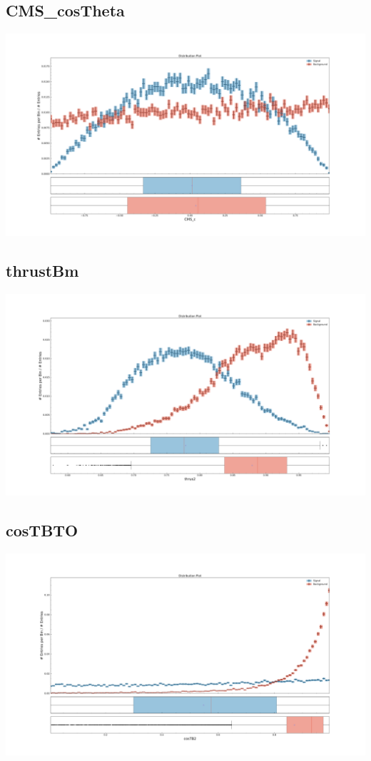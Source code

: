 \documentclass[10pt,a4paper]{article}
\begin{document}
\subsection{CMS\_cosTheta}
\begin{center}
\includegraphics[width=1.0\textwidth]{variable_-6000559205120170445.pdf}
\end{center}
\subsection{thrustBm}
\begin{center}
\includegraphics[width=1.0\textwidth]{variable_-8729160925505872471.pdf}
\end{center}
\subsection{cosTBTO}
\begin{center}
\includegraphics[width=1.0\textwidth]{variable_1918227861388781573.pdf}
\end{center}
\end{document}

